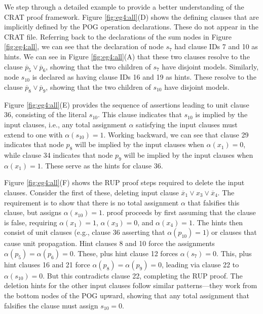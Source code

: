 \documentclass[letterpaper,USenglish,cleveref, autoref, thm-restate]{lipics-v2021}
\newcommand{\obar}[1]{\overline{#1}}
\newcommand{\assign}{\alpha}
\begin{document}
We step through a detailed example to provide a better understanding of the CRAT proof framework.
Figure
\ref{fig:eg4:all}(D) shows the defining clauses that are implicitly
defined by the POG operation declarations.  These do not appear in the
CRAT file.  Referring back to the declarations of the sum nodes in
Figure \ref{fig:eg4:all}, we can see that the declaration of node
$s_7$ had clause IDs 7 and 10 as hints.  We can see in Figure
\ref{fig:eg4:all}(A) that these two clauses resolve to the clause
$\obar{p}_5 \lor \obar{p}_6$, showing that the two children of $s_7$
have disjoint models.  Similarly, node $s_{10}$ is declared as having
clause IDs 16 and 19 as hints.  These resolve to the clause
$\obar{p}_8 \lor \obar{p}_9$, showing that the two children of
$s_{10}$ have disjoint models.

Figure \ref{fig:eg4:all}(E) provides the sequence of assertions
leading to unit clause 36, consisting of the literal $s_{10}$.  This clause indicates that $s_{10}$ is implied by the input clauses, i.e.,
any total assignment $\assign$
satisfying the input clauses must extend to one with $\assign(s_{10}) = 1$.
Working backward, we can see that
clause 29 indicates that node $p_8$ will be implied by the input
clauses when $\assign(x_1) = 0$, while clause 34 indicates that node $p_9$ will
be implied by the input clauses when $\assign(x_1) = 1$.  These serve as the
hints for clause 36.

Figure \ref{fig:eg4:all}(F) shows the RUP proof steps required to
delete the input clauses.  Consider the first of these, deleting
input clause $\obar{x}_1 \lor x_3 \lor \obar{x}_4$.  The requirement is to show
that there is no total assignment $\assign$ that falsifies this clause, but assigns $\assign(s_{10}) = 1$.
proof proceeds by first assuming that the clause is false, requiring
$\assign(x_1) = 1$, $\assign(x_3) = 0$, and $\assign(x_4) = 1$.  The hints then consist of unit
clauses (e.g., clause 36 asserting that $\alpha(p_{10}) = 1$) or
clauses that cause unit propagation.  Hint clauses 8 and 10 force the
assignments $\assign(p_5) = \assign(p_6) = 0$.  These, plus hint clause 12 forces
$\assign(s_7) = 0$.  This, plus hint clauses 16 and 21 force $\assign(p_8) = \assign(p_9) = 0$, leading
via clause 22 to $\assign(s_{10}) = 0$.  But this contradicts clause 22,
completing the RUP proof.  The deletion hints for the other input
clauses follow similar patterns---they work from the bottom nodes of
the POG upward, showing that any total assignment that falsifies the clause
must assign $s_{10} = 0$.
\end{document}
